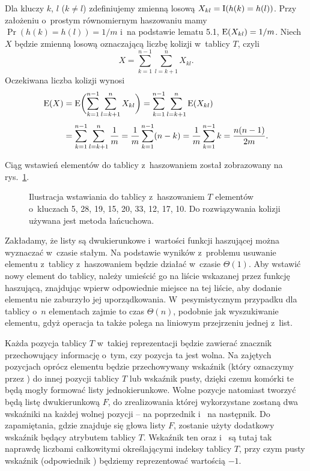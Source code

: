 
\exercise %
Dla kluczy $k$, $l$ ($k\ne l$) zdefiniujemy zmienną losową $X_{kl}=\operatorname{I}(h(k)=h(l))$.
Przy założeniu o~prostym równomiernym haszowaniu mamy $\Pr(h(k)=h(l))=1/m$ i~na podstawie lematu 5.1, $\operatorname{E}(X_{kl})=1/m$.
Niech $X$ będzie zmienną losową oznaczającą liczbę kolizji w~tablicy $T$, czyli
\[
    X = \sum_{k=1}^{n-1}\sum_{l=k+1}^nX_{kl}.
\]
Oczekiwana liczba kolizji wynosi
\begin{align*}
	\operatorname{E}(X) &= \operatorname{E}\biggl(\sum_{k=1}^{n-1}\sum_{l=k+1}^nX_{kl}\biggr) = \sum_{k=1}^{n-1}\sum_{l=k+1}^n\operatorname{E}(X_{kl}) \\[1mm]
	&= \sum_{k=1}^{n-1}\sum_{l=k+1}^n\frac{1}{m} = \frac{1}{m}\sum_{k=1}^{n-1}(n-k) = \frac{1}{m}\sum_{k=1}^{n-1}k = \frac{n(n-1)}{2m}.
\end{align*}

\exercise %
Ciąg wstawień elementów do tablicy z~haszowaniem został zobrazowany na rys.\ \ref{fig:11.2-2}.
\medskip
\begin{figure}[!ht]
	\centering 
	\caption{Ilustracja wstawiania do tablicy z~haszowaniem $T$ elementów o~kluczach 5, 28, 19, 15, 20, 33, 12, 17, 10.
Do rozwiązywania kolizji używana jest metoda łańcuchowa.} \label{fig:11.2-2}
\end{figure}

\exercise %
Zakładamy, że listy są dwukierunkowe i~wartości funkcji haszującej można wyznaczać w~czasie stałym.
Na podstawie wyników z~problemu  usuwanie elementu z~tablicy z~haszowaniem będzie działać w~czasie $\Theta(1)$.
Aby wstawić nowy element do tablicy, należy umieścić go na liście wskazanej przez funkcję haszującą, znajdując wpierw odpowiednie miejsce na tej liście, aby dodanie elementu nie zaburzyło jej uporządkowania.
W~pesymistycznym przypadku dla tablicy o~$n$ elementach zajmie to czas $\Theta(n)$, podobnie jak wyszukiwanie elementu, gdyż operacja ta także polega na liniowym przejrzeniu jednej z~list.

\exercise %

\noindent Każda pozycja tablicy $T$ w~takiej reprezentacji będzie zawierać znacznik przechowujący informację o~tym, czy pozycja ta jest wolna.
Na zajętych pozycjach oprócz elementu będzie przechowywany wskaźnik (który oznaczymy przez ) do innej pozycji tablicy $T$ lub wskaźnik pusty, dzięki czemu komórki te będą mogły formować listy jednokierunkowe.
Wolne pozycje natomiast tworzyć będą listę dwukierunkową $F$, do zrealizowania której wykorzystane zostaną dwa wskaźniki na każdej wolnej pozycji --  na poprzednik i~ na następnik.
Do zapamiętania, gdzie znajduje się głowa listy $F$, zostanie użyty dodatkowy wskaźnik będący atrybutem tablicy $T$.
Wskaźnik ten oraz  i~ są tutaj tak naprawdę liczbami całkowitymi określającymi indeksy tablicy $T$, przy czym pusty wskaźnik (odpowiednik ) będziemy reprezentować wartością $-1$.

